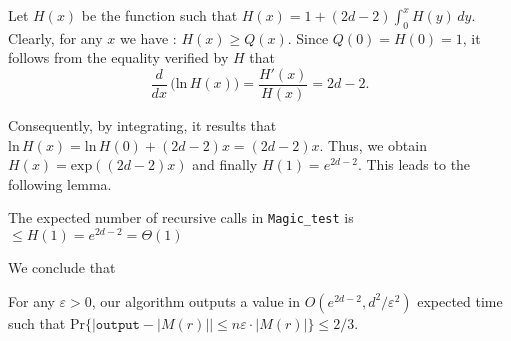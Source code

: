 Let $H(x)$ be the function such that $H(x) = 1 +(2d-2) \int_0^x H(y)\,dy$. Clearly, for any $x$ we have : $H(x) \geq Q(x)$. Since $Q(0) = H(0) = 1$, it follows from the equality verified by $H$ that
\[
\frac{d}{dx}\,\Big(\mathrm{ln}\,H(x)\Big) = \frac{H'(x)}{H(x)} = 2d-2.
\]

Consequently, by integrating, it results that $\mathrm{ln}\,H(x) = \mathrm{ln}\,H(0)+ (2d-2)x = (2d-2)x$. Thus, we obtain $H(x) = \mathrm{exp}((2d-2)x)$ and finally $H(1) = e^{2d-2}$. This leads to the following lemma.

\begin{lemma}
The expected number of recursive calls in \texttt{Magic\_test} is $\leq H(1) = e^{2d-2} = \Theta(1)$
\end{lemma}

We conclude that

\begin{theorem}
For any $\varepsilon >0$, our algorithm outputs a value in $O(e^{2d-2},d^2/\varepsilon^2)$ expected time such that $\mathrm{Pr}\{ |\texttt{output} - |M(r)|| \leq n \varepsilon \cdot |M(r)|\} \leq 2/3$.
\end{theorem}

